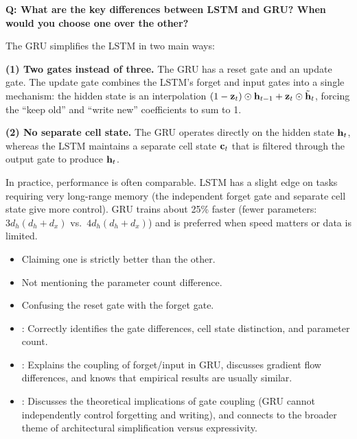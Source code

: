 \begin{interviewq}
\end{interviewq}

\begin{interviewq}
\textbf{Q: What are the key differences between LSTM and GRU? When would
you choose one over the other?}

 \quad {} \quad
\badgefreq{\freqmed}

\stronganswer
The GRU simplifies the LSTM in two main ways:

\textbf{(1) Two gates instead of three.}  The GRU has a reset gate and
an update gate.  The update gate combines the LSTM's forget and input
gates into a single mechanism: the hidden state is an interpolation
$(1 - \mathbf{z}_t) \odot \mathbf{h}_{t-1} + \mathbf{z}_t \odot
\tilde{\mathbf{h}}_t$, forcing the ``keep old'' and ``write new'' coefficients
to sum to 1.

\textbf{(2) No separate cell state.}  The GRU operates directly on the
hidden state $\mathbf{h}_t$, whereas the LSTM maintains a separate cell state
$\mathbf{c}_t$ that is filtered through the output gate to produce $\mathbf{h}_t$.

In practice, performance is often comparable.  LSTM has a slight edge
on tasks requiring very long-range memory (the independent forget gate
and separate cell state give more control).  GRU trains about 25\%
faster (fewer parameters: $3d_h(d_h + d_x)$ vs.\ $4d_h(d_h + d_x)$)
and is preferred when speed matters or data is limited.

\redflags
\begin{itemize}
\item Claiming one is strictly better than the other.
\item Not mentioning the parameter count difference.
\item Confusing the reset gate with the forget gate.
\end{itemize}


\goodgreat
\begin{itemize}
\item {}: Correctly identifies the gate differences, cell
  state distinction, and parameter count.
\item {}: Explains the coupling of forget/input in GRU,
  discusses gradient flow differences, and knows that empirical
  results are usually similar.
\item {}: Discusses the theoretical implications of gate
  coupling (GRU cannot independently control forgetting and writing),
  and connects to the broader theme of architectural simplification
  versus expressivity.
\end{itemize}


\end{interviewq}
